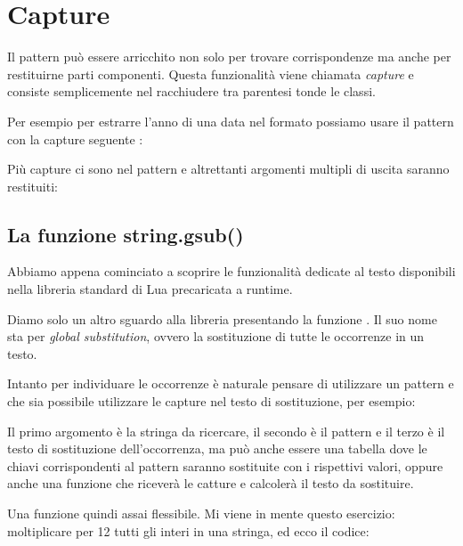 \section{Capture}

Il pattern può essere arricchito non solo per trovare corrispondenze ma anche
per restituirne parti componenti. Questa funzionalità viene chiamata
\emph{capture} e consiste semplicemente nel racchiudere tra parentesi tonde le
classi.

Per esempio per estrarre l'anno di una data nel formato 
possiamo usare il pattern con la capture seguente
:

Più capture ci sono nel pattern e altrettanti argomenti multipli di uscita
saranno restituiti:



\subsection{La funzione string.gsub()}

Abbiamo appena cominciato a scoprire le funzionalità dedicate al testo
disponibili nella libreria standard di Lua precaricata a runtime.

Diamo solo un altro sguardo alla libreria presentando la funzione
. Il suo nome sta per \emph{global substitution}, ovvero
la sostituzione di tutte le occorrenze in un testo.

Intanto per individuare le occorrenze è naturale pensare di utilizzare un
pattern e che sia possibile utilizzare le capture nel testo di sostituzione,
per esempio:

Il primo argomento è la stringa da ricercare, il secondo è il pattern e il
terzo è il testo di sostituzione dell'occorrenza, ma può anche essere una
tabella dove le chiavi corrispondenti al pattern saranno sostituite con
i rispettivi valori, oppure anche una funzione che riceverà le catture e
calcolerà il testo da sostituire.

Una funzione quindi assai flessibile. Mi viene in mente questo esercizio:
moltiplicare per 12 tutti gli interi in una stringa, ed ecco il codice:

